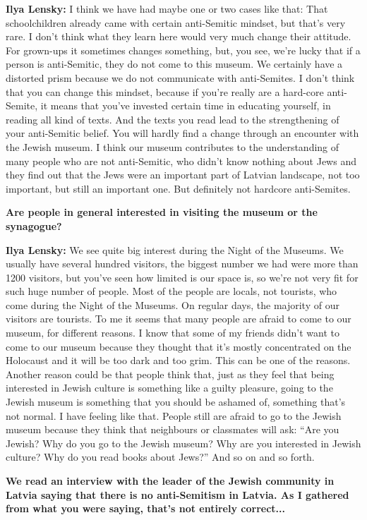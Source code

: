 \textbf{Ilya Lensky:} I think we have had maybe one or two cases like that: That schoolchildren already came with certain anti-Semitic mindset, but that’s very rare. I don’t think what they learn here would very much change their attitude. For grown-ups it sometimes changes something, but, you see, we’re lucky that if a person is anti-Semitic, they do not come to this museum. We certainly have a distorted prism because we do not communicate with anti-Semites. 
I don’t think that you can change this mindset, because if you’re really are a hard-core anti-Semite, it means that you’ve invested certain time in educating yourself, in reading all kind of texts. And the texts you read lead to the strengthening of your anti-Semitic belief. You will hardly find a change through an encounter with the Jewish museum. I think our museum contributes to the understanding of many people who are not anti-Semitic, who didn't know nothing about Jews and they find out that the Jews were an important part of Latvian landscape, not too important, but still an important one. But definitely not hardcore anti-Semites. 

\textbf{Are people in general interested in visiting the museum or the synagogue?} 

\textbf{Ilya Lensky:} We see quite big interest during the Night of the Museums. We usually have several hundred visitors, the biggest number we had were more than 1200 visitors, but you've seen how limited is our space is, so we’re not very fit for such huge number of people. Most of the people are locals, not tourists, who come during the Night of the Museums. On regular days, the majority of our visitors are tourists. To me it seems that many people are afraid to come to our museum, for different reasons. I know that some of my friends didn't want to come to our museum because they thought that it’s mostly concentrated on the Holocaust and it will be too dark and too grim. This can be one of the reasons. Another reason could be that people think that, just as they feel that being interested in Jewish culture is something like a guilty pleasure, going to the Jewish museum is something that you should be ashamed of, something that's not normal. I have feeling like that. People still are afraid to go to the Jewish museum because they think that neighbours or classmates will ask: ``Are you Jewish? Why do you go to the Jewish museum? Why are you interested in Jewish culture? Why do you read books about Jews?'' And so on and so forth.

\textbf{We read an interview with the leader of the Jewish community in Latvia saying that there is no anti-Semitism in Latvia. As I gathered from what you were saying, that’s not entirely correct...} 

